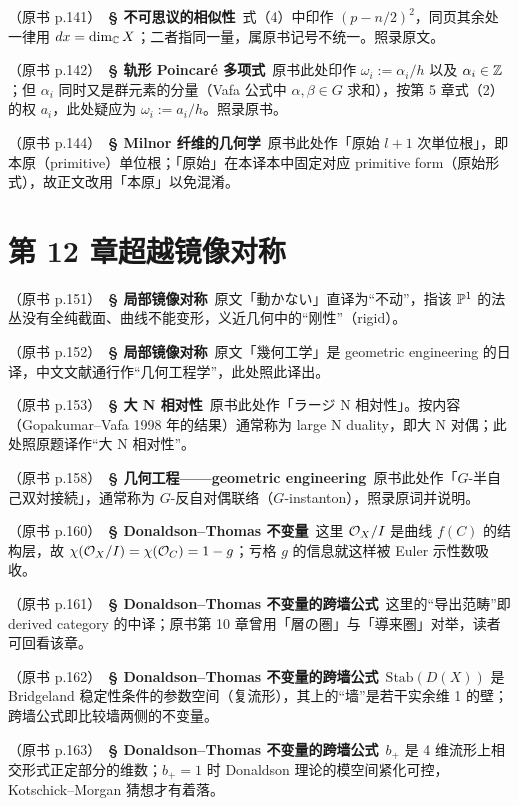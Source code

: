 \noindent （原书 p.141）\ \textbf{§ 不可思议的相似性}\ 式（4）中印作 $(p-n/2)^2$，同页其余处一律用 $dx=\dim_{\mathbb{C}}X$；二者指同一量，属原书记号不统一。照录原文。\par\smallskip

\noindent （原书 p.142）\ \textbf{§ 轨形 Poincaré 多项式}\ 原书此处印作 $\omega_i:=\alpha_i/h$ 以及 $\alpha_i\in\mathbb{Z}$；但 $\alpha_i$ 同时又是群元素的分量（Vafa 公式中 $\alpha,\beta\in G$ 求和），按第 5 章式（2）的权 $a_i$，此处疑应为 $\omega_i:=a_i/h$。照录原书。\par\smallskip

\noindent （原书 p.144）\ \textbf{§ Milnor 纤维的几何学}\ 原书此处作「原始 $l+1$ 次単位根」，即本原（primitive）单位根；「原始」在本译本中固定对应 primitive form（原始形式），故正文改用「本原」以免混淆。\par\smallskip

\section*{第 12 章\quad 超越镜像对称}

\noindent （原书 p.151）\ \textbf{§ 局部镜像对称}\ 原文「動かない」直译为“不动”，指该 $\mathbb{P}^{1}$ 的法丛没有全纯截面、曲线不能变形，义近几何中的“刚性”（rigid）。\par\smallskip

\noindent （原书 p.152）\ \textbf{§ 局部镜像对称}\ 原文「幾何工学」是 geometric engineering 的日译，中文文献通行作“几何工程学”，此处照此译出。\par\smallskip

\noindent （原书 p.153）\ \textbf{§ 大 N 相对性}\ 原书此处作「ラージ N 相対性」。按内容（Gopakumar--Vafa 1998 年的结果）通常称为 large N duality，即大 N 对偶；此处照原题译作“大 N 相对性”。\par\smallskip

\noindent （原书 p.158）\ \textbf{§ 几何工程——geometric engineering}\ 原书此处作「$G$-半自己双対接続」，通常称为 $G$-反自对偶联络（$G$-instanton），照录原词并说明。\par\smallskip

\noindent （原书 p.160）\ \textbf{§ Donaldson--Thomas 不变量}\ 这里 $\mathcal{O}_X/I$ 是曲线 $f(C)$ 的结构层，故 $\chi(\mathcal{O}_X/I)=\chi(\mathcal{O}_C)=1-g$；亏格 $g$ 的信息就这样被 Euler 示性数吸收。\par\smallskip

\noindent （原书 p.161）\ \textbf{§ Donaldson--Thomas 不变量的跨墙公式}\ 这里的“导出范畴”即 derived category 的中译；原书第 10 章曾用「層の圏」与「導来圏」对举，读者可回看该章。\par\smallskip

\noindent （原书 p.162）\ \textbf{§ Donaldson--Thomas 不变量的跨墙公式}\ $\mathrm{Stab}(D(X))$ 是 Bridgeland 稳定性条件的参数空间（复流形），其上的“墙”是若干实余维 1 的壁；跨墙公式即比较墙两侧的不变量。\par\smallskip

\noindent （原书 p.163）\ \textbf{§ Donaldson--Thomas 不变量的跨墙公式}\ $b_+$ 是 4 维流形上相交形式正定部分的维数；$b_+=1$ 时 Donaldson 理论的模空间紧化可控，Kotschick--Morgan 猜想才有着落。\par\smallskip
